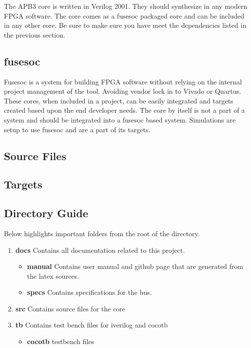 \par
The APB3 core is written in Verilog 2001. They should synthesize in any modern FPGA software. The core comes as a fusesoc packaged core and can be
included in any other core. Be sure to make sure you have meet the dependencies listed in the previous section.

\subsection{fusesoc}
\par
Fusesoc is a system for building FPGA software without relying on the internal project management of the tool. Avoiding vendor lock in to Vivado or Quartus.
These cores, when included in a project, can be easily integrated and targets created based upon the end developer needs. The core by itself is not a part of
a system and should be integrated into a fusesoc based system. Simulations are setup to use fusesoc and are a part of its targets.

\subsection{Source Files}



\subsection{Targets}



\subsection{Directory Guide}

\par
Below highlights important folders from the root of the directory.

\begin{enumerate}
  \item \textbf{docs} Contains all documentation related to this project.
    \begin{itemize}
      \item \textbf{manual} Contains user manual and github page that are generated from the latex sources.
      \item \textbf{specs} Contains specifications for the bus.
    \end{itemize}
  \item \textbf{src} Contains source files for the core
  \item \textbf{tb} Contains test bench files for iverilog and cocotb
    \begin{itemize}
      \item \textbf{cocotb} testbench files
    \end{itemize}
\end{enumerate}

